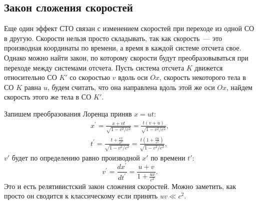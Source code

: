 \subsection{Закон сложения скоростей}
Еще один эффект СТО связан с изменением скоростей при переходе из одной СО в другую. Скорости нельзя просто складывать, так как скорость~--- это производная координаты по времени, а время в каждой системе отсчета свое. Однако можно найти закон, по которому скорости будут преобразовываться при переходе между системами отсчета. Пусть система отсчета $K$ движется относительно СО $K'$ со скоростью $v$ вдоль оси $Ox$, скорость некоторого тела в СО $K$ равна $u$, будем считать, что она направлена вдоль этой же оси $Ox$, найдем скорость этого же тела в СО $K'$.

Запишем преобразования Лоренца приняв $x=ut$:
\begin{gather*}
x^{\prime}=\frac{x+v t}{\sqrt{1-v^2 / c^2}} = \frac{t(v+u)}{\sqrt{1-v^2 / c^2}}, \\
t^{\prime}=\frac{t+\frac{v x}{c^2}}{\sqrt{1-v^2 / c^2}} = \frac{t\left(1+\frac{v u}{c^2}\right)}{\sqrt{1-v^2 / c^2}},
\end{gather*}
$v'$ будет по определению равно производной $x'$ по времени $t'$:
\begin{equation}
	v^{\prime}=\frac{d x^{\prime}}{d t^{\prime}}=\frac{u+v}{1+\frac{u v}{c^2}}.
\end{equation}
Это и есть релятивистский закон сложения скоростей. Можно заметить, как просто он сводится к классическому если принять $uv \ll c^2$.